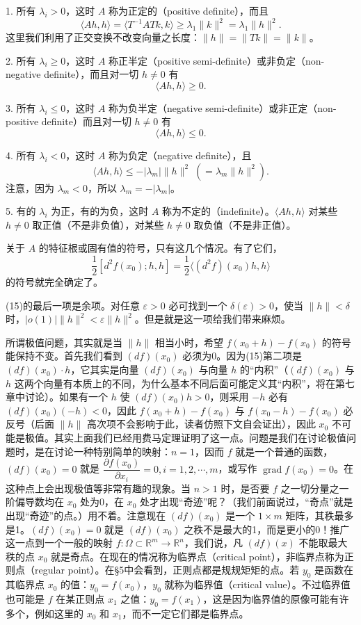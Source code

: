 1. 所有 $\lambda_i>0$，这时 $A$ 称为正定的（positive definite），而且
\[
 \langle Ah,h\rangle=\langle T^{-1}ATk,k\rangle\ge\lambda_1\lVert k\rVert^2=\lambda_1\lVert h\rVert^2.
\]
这里我们利用了正交变换不改变向量之长度：$\lVert h\rVert=\lVert Tk\rVert=\lVert k\rVert$。

2. 所有 $\lambda_i\ge0$，这时 $A$ 称正半定（positive semi-definite）或非负定（non-negative definite），而且对一切 $h\ne0$ 有
\[
 \langle Ah,h\rangle\ge0.
\]

3. 所有 $\lambda_i\le0$，这时 $A$ 称为负半定（negative semi-definite）或非正定（non-positive definite）而且对一切 $h\ne0$ 有
\[
 \langle Ah,h\rangle\le0.
\]

4. 所有 $\lambda_i<0$，这时 $A$ 称为负定（negative definite），且
\[
 \langle Ah,h\rangle\le-|\lambda_m|\lVert h\rVert^2\;(=\lambda_m\lVert h\rVert^2).
\]
注意，因为 $\lambda_m<0$，所以 $\lambda_m=-|\lambda_m|$。

5. 有的 $\lambda_i$ 为正，有的为负，这时 $A$ 称为不定的（indefinite）。$\langle Ah,h\rangle$ 对某些 $h\ne0$ 取正值（不是非负值），对某些 $h\ne0$ 取负值（不是非正值）。

关于 $A$ 的特征根或固有值的符号，只有这几个情况。有了它们，\[\frac12[d^2f(x_0);h,h]=\frac12\langle(d^2f)(x_0)h,h\rangle\]的符号就完全确定了。

(15)的最后一项是余项。对任意 $\varepsilon>0$ 必可找到一个 $\delta(\varepsilon)>0$，使当 $\lVert h\rVert<\delta$ 时，$|o(1)|\lVert h\rVert^2<\varepsilon\lVert h\rVert^2$。但是就是这一项给我们带来麻烦。

所谓极值问题，其实就是当 $\lVert h\rVert$ 相当小时，希望 $f(x_0+h)-f(x_0)$ 的符号能保持不变。首先我们看到 $(df)(x_0)$ 必须为0。因为(15)第二项是 $(df)(x_0)\cdot h$，它其实是向量 $(df)(x_0)$ 与向量 $h$ 的“内积”（$(df)(x_0)$ 与 $h$ 这两个向量有本质上的不同，为什么基本不同后面可能定义其“内积”，将在第七章中讨论）。如果有一个 $h$ 使 $(df)(x_0)h>0$，则采用 $-h$ 必有 $(df)(x_0)(-h)<0$，因此 $f(x_0+h)-f(x_0)$ 与 $f(x_0-h)-f(x_0)$ 必反号（后面 $\lVert h\rVert$ 高次项不会影响于此，读者仿照下文自会证出），因此 $x_0$ 不可能是极值。其实上面我们已经用费马定理证明了这一点。问题是我们在讨论极值问题时，是在讨论一种特别简单的映射：$n=1$，因而 $f$ 就是一个普通的函数，$(df)(x_0)=0$ 就是 $\dfrac{\partial f(x_0)}{\partial x_i}=0, i=1,2,\cdots,m$，或写作 $\operatorname{grad}f(x_0)=0$。在这种点上会出现极值等非常有趣的现象。当 $n>1$ 时，是否要 $f$ 之一切分量之一阶偏导数均在 $x_0$ 处为0，在 $x_0$ 处才出现“奇迹”呢？（我们前面说过，“奇点”就是出现“奇迹”的点。）用不着。注意现在 $(df)(x_0)$ 是一个 $1\times m$ 矩阵，其秩最多是1。$(df)(x_0)=0$ 就是 $(df)(x_0)$ 之秩不是最大的1，而是更小的0！推广这一点到一个一般的映射 $f:\Omega\subset\mathbb R^m\to\mathbb R^n$，我们说，凡 $(df)(x)$ 不能取最大秩的点 $x_0$ 就是奇点。在现在的情况称为临界点（critical point），非临界点称为正则点（regular point）。在§5中会看到，正则点都是规规矩矩的点。若 $y_0$ 是函数在其临界点 $x_0$ 的值：$y_0=f(x_0)$，$y_0$ 就称为临界值（critical value）。不过临界值也可能是 $f$ 在某正则点 $x_1$ 之值：$y_0=f(x_1)$，这是因为临界值的原像可能有许多个，例如这里的 $x_0$ 和 $x_1$，而不一定它们都是临界点。


